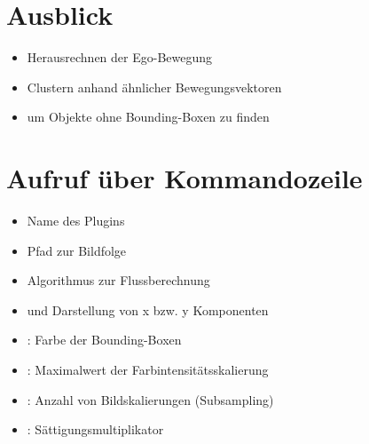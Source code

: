 \documentclass[10pt]{beamer}
\begin{document}
\section{Ausblick}
\begin{frame}{\secname}
\begin{itemize}
	\item Herausrechnen der Ego-Bewegung
	\item Clustern anhand ähnlicher Bewegungsvektoren
	\item um Objekte ohne Bounding-Boxen zu finden
\end{itemize}
\end{frame}

\section{Aufruf über Kommandozeile}
\begin{frame}{\secname}
	
	
	\begin{itemize}
		\item {} Name des Plugins
		\item {} Pfad zur Bildfolge
		\item {} Algorithmus zur Flussberechnung
		\item {} und  Darstellung von x bzw. y Komponenten
		
		\item{}: Farbe der Bounding-Boxen
		
		\item{}: Maximalwert der Farbintensitätsskalierung
		
		\item{}: Anzahl von Bildskalierungen (Subsampling)
		
		\item{}: Sättigungsmultiplikator
	\end{itemize}
	
\end{frame}






%  
%  

\end{document}
